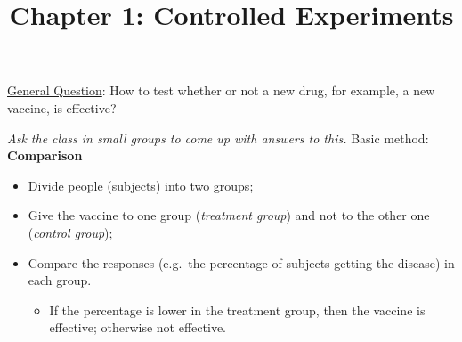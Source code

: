 \documentclass[
  ignorenonframetext, 10pt
]{beamer}
\title{Chapter 1: Controlled Experiments}
\author{}
\date{\vspace{-2.5em}}
\providecommand{\tightlist}{%
  \setlength{\itemsep}{0pt}\setlength{\parskip}{0pt}}
\newcommand{\red}[1]{\textit{\textcolor{rubineRed}{#1}}}
\begin{document}
\frame{\titlepage}

\begin{frame}{}
\protect\hypertarget{section}{}
\underline{General Question}: How to test whether or not a new drug, for
example, a new vaccine, is effective?

\emph{Ask the class in small groups to come up with answers to this.}
\bigskip
\pause
Basic method: \textbf{Comparison}

\begin{itemize}
\tightlist
\item
  Divide people (subjects) into two groups;
\item
  Give the vaccine to one group (\red{treatment group}) and not to the
  other one (\red{control group});
\item
  Compare the responses (e.g.~the percentage of subjects getting the
  disease) in each group.

  \begin{itemize}
  \tightlist
  \item
    If the percentage is lower in the treatment group, then the vaccine
    is effective; otherwise not effective.
  \end{itemize}
\end{itemize}
\end{frame}
\end{document}
